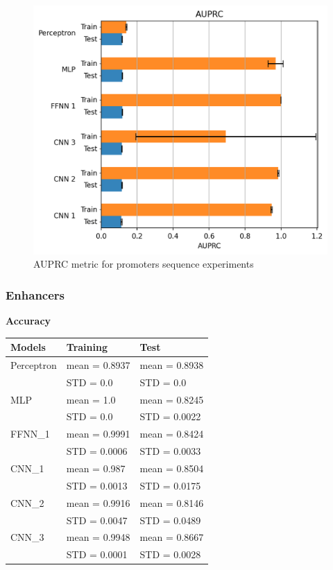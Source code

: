 \begin{figure}[h!]
\centering
\includegraphics[width=0.8\linewidth]{../images/sequence_results/promoters/auprc.png}
\caption{AUPRC metric for promoters sequence experiments}
\end{figure}

\subsubsection{Enhancers}\label{header-n1661}

\textbf{Accuracy}

\begin{longtable}[]{@{}lll@{}}
\toprule
\textbf{Models} & \textbf{Training} & \textbf{Test}\tabularnewline
\midrule
\endhead
Perceptron & mean = 0.8937 & mean = 0.8938\tabularnewline
& STD = 0.0 & STD = 0.0\tabularnewline
MLP & mean = 1.0 & mean = 0.8245\tabularnewline
& STD = 0.0 & STD = 0.0022\tabularnewline
FFNN\_1 & mean = 0.9991 & mean = 0.8424\tabularnewline
& STD = 0.0006 & STD = 0.0033\tabularnewline
CNN\_1 & mean = 0.987 & mean = 0.8504\tabularnewline
& STD = 0.0013 & STD = 0.0175\tabularnewline
CNN\_2 & mean = 0.9916 & mean = 0.8146\tabularnewline
& STD = 0.0047 & STD = 0.0489\tabularnewline
CNN\_3 & mean = 0.9948 & mean = 0.8667\tabularnewline
& STD = 0.0001 & STD = 0.0028\tabularnewline
\bottomrule
\end{longtable}

